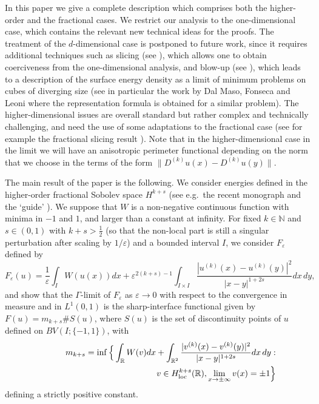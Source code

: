 \documentclass{article}
\newcommand{\e}{\varepsilon}
\begin{document}
\smallskip
In this paper we give a complete description which comprises both the higher-order and the fractional cases. We restrict our analysis to the one-dimensional case, which contains the relevant new technical ideas for the proofs. The treatment of the $d$-dimensional case is postponed to future work, since it requires additional techniques such as slicing (see \cite{bln,alberti}), which allows one to obtain coerciveness from the one-dimensional analysis, and blow-up (see \cite{FMu}), which leads to a description of the surface energy density as a limit of minimum problems on cubes of diverging size (see in particular the work by Dal Maso, Fonseca and Leoni \cite{MR3748585} where the representation formula is obtained for a similar problem). The higher-dimensional issues are overall standard but rather complex and technically challenging, and need the use of some adaptations to the fractional case (see for example the fractional slicing result \cite[Theorem 6.47]{leofrac}). Note that in the higher-dimensional case in the limit we will have an anisotropic perimeter functional 
depending on the norm that we choose in the terms of the form $\|D^{(k)}u(x)-D^{(k)}u(y)\|$.

The main result of the paper is the following.
We consider energies defined in the higher-order fractional Sobolev space $H^{k+s}$ (see e.g.~the recent monograph \cite{leofrac} and the `guide' \cite{DPV}). We suppose that $W$ is a non-negative continuous function with minima in $-1$ and $1$, and larger than a constant at infinity.
For fixed $k\in \mathbb N$ and $s\in(0,1)$ with $k+s>\frac12$ (so that the non-local part is still a singular perturbation after scaling by $1/\e$) and a bounded interval $I$, we consider $F_\e$ defined by
$$
F_\e(u)=\frac1\e\int_I W(u(x))dx+\e^{2(k+s)-1}\int_{I\times I} \frac{|u^{(k)}(x)-u^{(k)}(y)|^2}{|x-y|^{1+2s}} dx\,dy,
$$
and show that the $\Gamma$-limit of $F_\e$ as $\e\to 0$ with respect to the convergence in measure and in $L^1(0,1)$ is the sharp-interface functional given by 
$F(u)= m_{k+s}\# S(u)$, where $S(u)$ is the set of discontinuity points of $u$ defined on $BV(I;\{-1,1\})$, with
\begin{eqnarray}\label{emme}\nonumber
&&m_{k+s} =\inf\Big\{\int_{\mathbb R} W(v)dx+\int_{\mathbb R^2}\frac{|v^{(k)}(x)-v^{(k)}(y)|^2}{|x-y|^{1+2s}} dx\,dy :\\
&& \hskip4.5cm v\in H^{k+s}_{\rm loc}(\mathbb R), \lim_{x\to\pm\infty}v(x)=\pm1\Big\}
\end{eqnarray}
defining a strictly positive constant.
\end{document}
